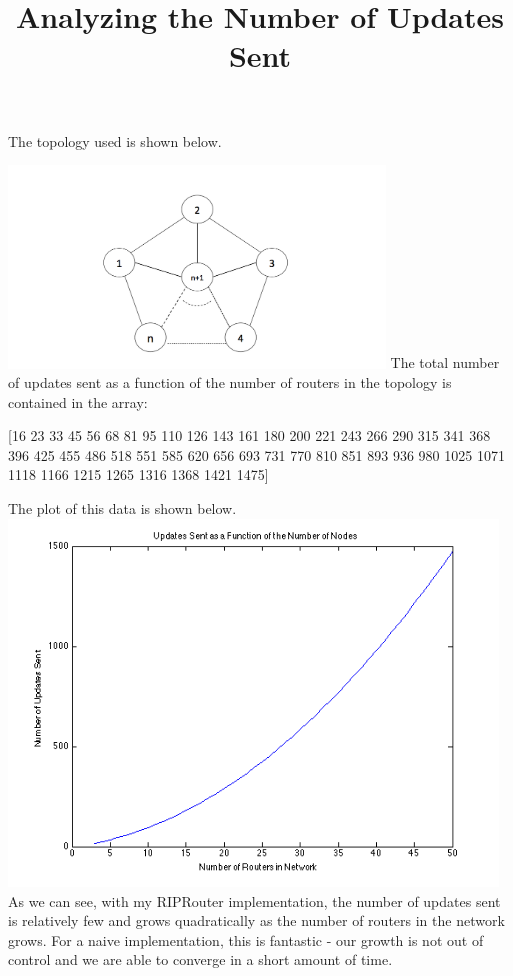 \documentclass[]{article}
\begin{document}
\title{Analyzing the Number of Updates Sent}
\maketitle
\newpage
The topology used is shown below. \\
\linebreak

\begin{center}
\includegraphics[width=10cm]{topo.png}
\linebreak
The total number of updates sent as a function of the number of routers in the topology is contained in the array: 
\linebreak

[16
23
33
45
56
68
81
95
110
126
143
161
180
200
221
243
266
290
315
341
368
396
425
455
486
518
551
585
620
656
693
731
770
810
851
893
936
980
1025
1071
1118
1166
1215
1265
1316
1368
1421
1475]
\linebreak

The plot of this data is shown below.
\includegraphics[width=13cm]{plot.png}
\linebreak
As we can see, with my RIPRouter implementation, the number of updates sent is relatively few and grows quadratically as the number of routers in the network grows. For a naive implementation, this is fantastic - our growth is not out of control and we are able to converge in a short amount of time. 
\end{center}
\end{document}
